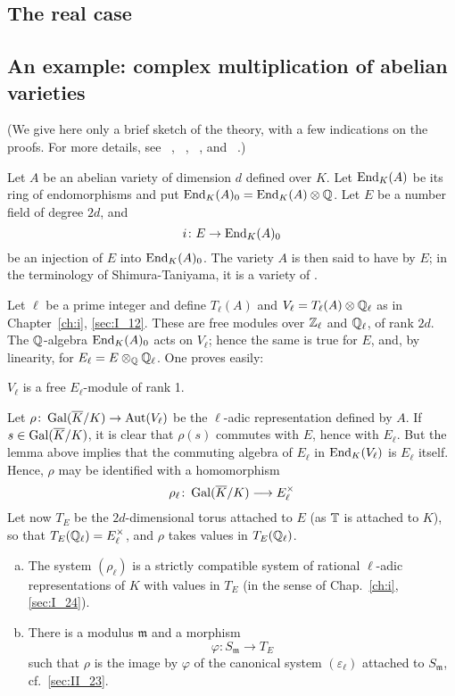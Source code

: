 \subsection{The real case}

\subsection{An example: complex multiplication of abelian varieties}
\label{sec:II_28}
(We give here only a brief sketch of the theory, with a few indications on the
proofs. For more details, see \citeauthor{34}~\cite{34},
\citeauthor{35}~\cite{35}, \citeauthor{41}~\cite{41}, \cite{42} and
\citeauthor{32}~\cite{32}.)

Let $A$ be an abelian variety of dimension $d$ defined over $K$.
Let $\operatorname{End}_K(A)$ be its ring of endomorphisms and put
$\operatorname{End}_K(A)_0 = \operatorname{End}_K(A) \otimes \mathbb{Q}$.
Let $E$ be a number field of degree $2d$, and
\dpage
\[
	i \colon E \to \operatorname{End}_K(A)_0
\]
be an injection of $E$ into $\operatorname{End}_K(A)_0$. The variety $A$ is then said to
have  by $E$; in the terminology of
Shimura-Taniyama, it is a variety of .

Let $\ell$ be a prime integer and define $T_\ell(A)$ and $V_\ell = T_\ell(A)
\otimes \mathbb{Q}_\ell$ as in Chapter~\ref{ch:i}, \ref{sec:I_12}. These are free
modules over $\mathbb{Z}_\ell$ and $\mathbb{Q}_\ell$, of rank $2d$. The $\mathbb{Q}$-algebra
$\operatorname{End}_K(A)_0$ acts on $V_\ell$; hence the same is true for $E$, and, by
linearity, for $E_\ell = E \otimes_{\mathbb{Q}} \mathbb{Q}_\ell$. One proves easily:

\begin{lem}
	$V_\ell$ is a free $E_\ell$-module of rank 1.
\end{lem}

Let $\rho\colon \operatorname{Gal}(\overline{K}/K) \to \operatorname{Aut}(V_\ell)$ be the $\ell$-adic
representation defined by $A$. If $s \in \operatorname{Gal}(\overline{K}/K)$, it is clear that
$\rho(s)$ commutes with $E$, hence with $E_\ell$. But the lemma above implies
that the commuting algebra of $E_\ell$ in $\operatorname{End}_K(V_\ell)$ is $E_\ell$ itself.
Hence, $\rho$ may be identified with a homomorphism
\[
	\rho_\ell\colon \operatorname{Gal}(\overline{K}/K) \longrightarrow E^\times_\ell
\]
Let now $T_E$ be the $2d$-dimensional torus attached to $E$ (as $\mathbb{T}$ is
attached to $K$), so that $T_E(\mathbb{Q}_\ell) = E_\ell^\times$, and $\rho$ takes
values in $T_E(\mathbb{Q}_\ell)$.

\begin{thm}\label{thm:II_28_1}
\begin{enumerate}[(a)]
\item\label{thm:II_28_1a}
	The system $(\rho_\ell)$ is a strictly compatible system of rational
	$\ell$-adic representations of $K$ with values in $T_E$ (in the sense
	\dpage
	of Chap.~\ref{ch:i}, \ref{sec:I_24}).
\item\label{thm:II_28_1b}
	There is a modulus $\mathfrak{m}$ and a morphism
	\[
		\varphi \colon S_{\mathfrak{m}} \longrightarrow T_E
	\]
	such that $\rho$ is the image by $\varphi$ of the canonical system
	$(\varepsilon_\ell)$ attached to $S_{\mathfrak{m}}$, cf.\ 
	\ref{sec:II_23}.
\end{enumerate}
\end{thm}

